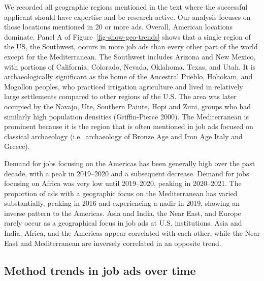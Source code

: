 \documentclass[
  12pt,
]{article}
\begin{document}
We recorded all geographic regions mentioned in the text where the
successful applicant should have expertise and be research active. Our
analysis focuses on those locations mentioned in 20 or more ads.
Overall, American locations dominate. Panel A of
Figure~\ref{fig-show-geo-trends} shows that a single region of the US,
the Southwest, occurs in more job ads than every other part of the world
except for the Mediterranean. The Southwest includes Arizona and New
Mexico, with portions of California, Colorado, Nevada, Oklahoma, Texas,
and Utah. It is archaeologically significant as the home of the
Ancestral Pueblo, Hohokam, and Mogollon peoples, who practiced
irrigation agriculture and lived in relatively large settlements
compared to other regions of the U.S. The area was later occupied by the
Navajo, Ute, Southern Paiute, Hopi and Zuni, groups who had similarly
high population densities (Griffin-Pierce 2000). The Mediterranean is
prominent because it is the region that is often mentioned in job ads
focused on classical archaeology (i.e.~archaeology of Bronze Age and
Iron Age Italy and Greece).

Demand for jobs focusing on the Americas has been generally high over
the past decade, with a peak in 2019--2020 and a subsequent decrease.
Demand for jobs focusing on Africa was very low until 2019--2020,
peaking in 2020--2021. The proportion of ads with a geographic focus on
the Mediterranean has varied substantially, peaking in 2016 and
experiencing a nadir in 2019, showing an inverse pattern to the
Americas. Asia and India, the Near East, and Europe rarely occur as a
geographical focus in job ads at U.S. institutions. Asia and India,
Africa, and the Americas appear correlated with each other, while the
Near East and Mediterranean are inversely correlated in an opposite
trend.

\subsection{Method trends in job ads over
time}\label{method-trends-in-job-ads-over-time}
\end{document}
